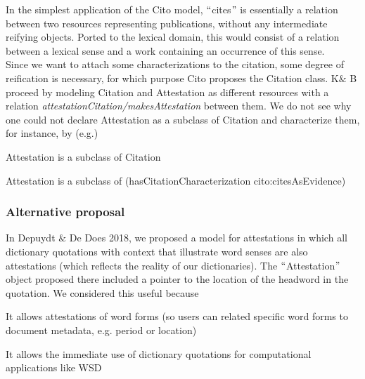 \documentclass[10pt]{article}
\let\tempone\itemize
\let\temptwo\enditemize
\renewenvironment{itemize}{\tempone\setlength\itemsep{-0.5pt}}{\temptwo}
\begin{document}
In the simplest application of the Cito model, $``$cites$"$  is essentially a relation between two resources representing publications, without any intermediate reifying objects. Ported to the lexical domain, this would consist of a relation between a lexical sense and a work containing an occurrence of this sense. \\
Since we want to attach some characterizations to the citation, some degree of reification is necessary, for which purpose Cito proposes the Citation class. K$\&$ B proceed by modeling Citation and Attestation as different resources with a relation \textit{attestationCitation/makesAttestation }between them. We do not see why one could not declare Attestation as a subclass of Citation and characterize them, for instance, by (e.g.)

\begin{itemize}
	\item {\fontsize{10pt}{12.0pt}\selectfont Attestation is a subclass of Citation\par}\par

	\item {\fontsize{10pt}{12.0pt}\selectfont Attestation is a subclass of (hasCitationCharacterization cito:citesAsEvidence)\par}
\end{itemize}








\subsubsection*{Alternative proposal}


 In Depuydt $\&$  De Does 2018, we proposed a model for attestations in which all dictionary quotations with context that illustrate word senses are also attestations (which reflects the reality of our dictionaries). The $``$Attestation$"$  object proposed there included a pointer to the location of the headword in the quotation. We considered this useful because\par

\begin{itemize}
	\item  It allows attestations of  word forms (so users can related specific word forms to document metadata, e.g. period or location)

	\item  It allows the immediate use of dictionary quotations for computational applications like WSD
\end{itemize}\par
\end{document}
